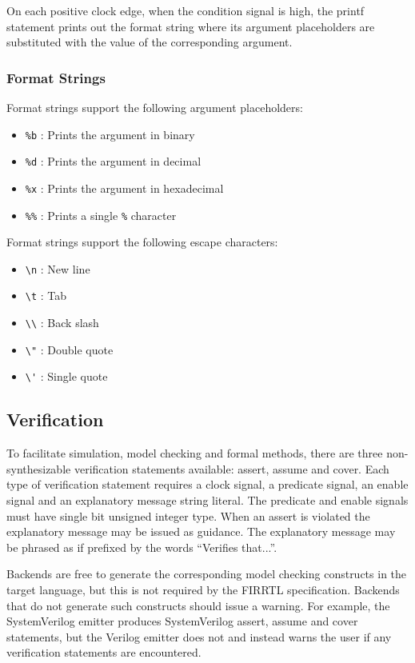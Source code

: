 \documentclass[12pt]{article}
\begin{document}
On each positive clock edge, when the condition signal is high, the printf statement prints out the format string where its argument placeholders are substituted with the value of the corresponding argument.

\subsubsection{Format Strings}

Format strings support the following argument placeholders:
\begin{itemize}
\item \verb|%b| : Prints the argument in binary
\item \verb|%d| : Prints the argument in decimal
\item \verb|%x| : Prints the argument in hexadecimal
\item \verb|%%| : Prints a single \verb|%| character
\end{itemize}

Format strings support the following escape characters:
\begin{itemize}
\item \verb|\n| : New line
\item \verb|\t| : Tab
\item \verb|\\| : Back slash
\item \verb|\"| : Double quote
\item \verb|\'| : Single quote
\end{itemize}

\subsection{Verification}

To facilitate simulation, model checking and formal methods, there are three non-synthesizable verification statements available: assert, assume and cover. Each type of verification statement requires a clock signal, a predicate signal, an enable signal and an explanatory message string literal. The predicate and enable signals must have single bit unsigned integer type. When an assert is violated the explanatory message may be issued as guidance. The explanatory message may be phrased as if prefixed by the words ``Verifies that...''.

Backends are free to generate the corresponding model checking constructs in the target language, but this is not required by the FIRRTL specification. Backends that do not generate such constructs should issue a warning. For example, the SystemVerilog emitter produces SystemVerilog assert, assume and cover statements, but the Verilog emitter does not and instead warns the user if any verification statements are encountered.
\end{document}
